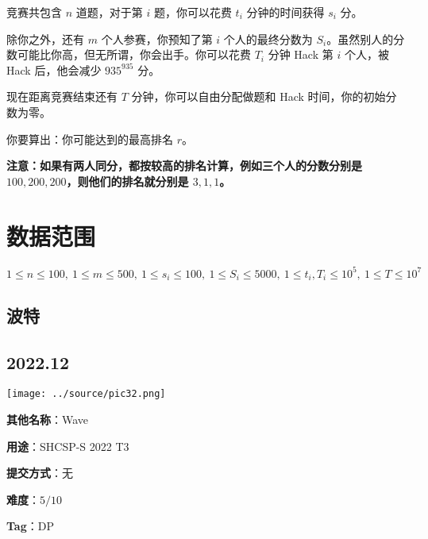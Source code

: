 \documentclass[a4paper,10pt]{article}
\begin{document}
竞赛共包含 $n$ 道题，对于第 $i$ 题，你可以花费 $t_i$ 分钟的时间获得 $s_i$ 分。

除你之外，还有 $m$ 个人参赛，你预知了第 $i$ 个人的最终分数为 $S_i$。虽然别人的分数可能比你高，但无所谓，你会出手。你可以花费 $T_i$ 分钟 Hack 第 $i$ 个人，被 Hack 后，他会减少 $935^{935}$ 分。

现在距离竞赛结束还有 $T$ 分钟，你可以自由分配做题和 Hack 时间，你的初始分数为零。

你要算出：你可能达到的最高排名 $r$。

\textbf{注意：如果有两人同分，都按较高的排名计算，例如三个人的分数分别是 $100,200,200$，则他们的排名就分别是 $3,1,1$。}

\section*{数据范围}

$1\leq n\leq 100,\ 1\leq m\leq 500,\ 1\leq s_i\leq 100,\ 1\leq S_i\leq 5000,\ 1\leq t_i,T_i\leq 10^5,\ 1\leq T\leq 10^7$

\newpage

\vspace*{\fill}
\begin{center}

\section{波特}

\subsection*{2022.12}

\vspace{10pt}

\texttt{[image: ../source/pic32.png]}

\vspace{10pt}

\textbf{其他名称}：Wave

\vspace{10pt}

\textbf{用途}：SHCSP-S 2022 T3

\vspace{10pt}

\textbf{提交方式}：无

\vspace{10pt}

\textbf{难度}：$5/10$

\vspace{10pt}

\textbf{Tag}：DP

\end{center}
\vspace*{\fill}
\end{document}
